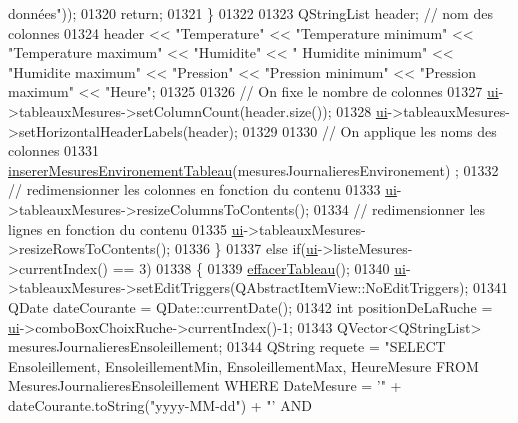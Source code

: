 \begin{DoxyCode}
{       données"}));
01320             \textcolor{keywordflow}{return};
01321         \}
01322 
01323         QStringList header; \textcolor{comment}{// nom des colonnes}
01324         header << \textcolor{stringliteral}{"Temperature"} << \textcolor{stringliteral}{"Temperature minimum"} << \textcolor{stringliteral}{"Temperature maximum"} << \textcolor{stringliteral}{"Humidite"} << \textcolor{stringliteral}{"
      Humidite minimum"} << \textcolor{stringliteral}{"Humidite maximum"}  << \textcolor{stringliteral}{"Pression"} <<  \textcolor{stringliteral}{"Pression minimum"} << \textcolor{stringliteral}{"Pression maximum"}  << \textcolor{stringliteral}{"Heure"};
01325 
01326         \textcolor{comment}{// On fixe le nombre de colonnes}
01327         \hyperlink{class_ruche_ihm_a64786058bd7f88ca2f1e9743bb27c25b}{ui}->tableauxMesures->setColumnCount(header.size());
01328         \hyperlink{class_ruche_ihm_a64786058bd7f88ca2f1e9743bb27c25b}{ui}->tableauxMesures->setHorizontalHeaderLabels(header);
01329 
01330         \textcolor{comment}{// On applique les noms des colonnes}
01331         \hyperlink{class_ruche_ihm_a7c292baed04f6240697afb6c6f894358}{insererMesuresEnvironementTableau}(mesuresJournalieresEnvironement)
      ;
01332         \textcolor{comment}{// redimensionner les colonnes en fonction du contenu}
01333         \hyperlink{class_ruche_ihm_a64786058bd7f88ca2f1e9743bb27c25b}{ui}->tableauxMesures->resizeColumnsToContents();
01334         \textcolor{comment}{// redimensionner les lignes en fonction du contenu}
01335         \hyperlink{class_ruche_ihm_a64786058bd7f88ca2f1e9743bb27c25b}{ui}->tableauxMesures->resizeRowsToContents();
01336     \}
01337     \textcolor{keywordflow}{else} \textcolor{keywordflow}{if}(\hyperlink{class_ruche_ihm_a64786058bd7f88ca2f1e9743bb27c25b}{ui}->listeMesures->currentIndex() == 3)
01338     \{
01339         \hyperlink{class_ruche_ihm_a386868ba4e6e37b9d877fe3ab330e605}{effacerTableau}();
01340         \hyperlink{class_ruche_ihm_a64786058bd7f88ca2f1e9743bb27c25b}{ui}->tableauxMesures->setEditTriggers(QAbstractItemView::NoEditTriggers);
01341         QDate dateCourante = QDate::currentDate();
01342         \textcolor{keywordtype}{int} positionDeLaRuche = \hyperlink{class_ruche_ihm_a64786058bd7f88ca2f1e9743bb27c25b}{ui}->comboBoxChoixRuche->currentIndex()-1;
01343         QVector<QStringList> mesuresJournalieresEnsoleillement;
01344         QString requete = \textcolor{stringliteral}{"SELECT  Ensoleillement, EnsoleillementMin, EnsoleillementMax, HeureMesure FROM
       MesuresJournalieresEnsoleillement WHERE DateMesure = '"} + dateCourante.toString(\textcolor{stringliteral}{"yyyy-MM-dd"}) + \textcolor{stringliteral}{"' AND
}
\end{DoxyCode}
